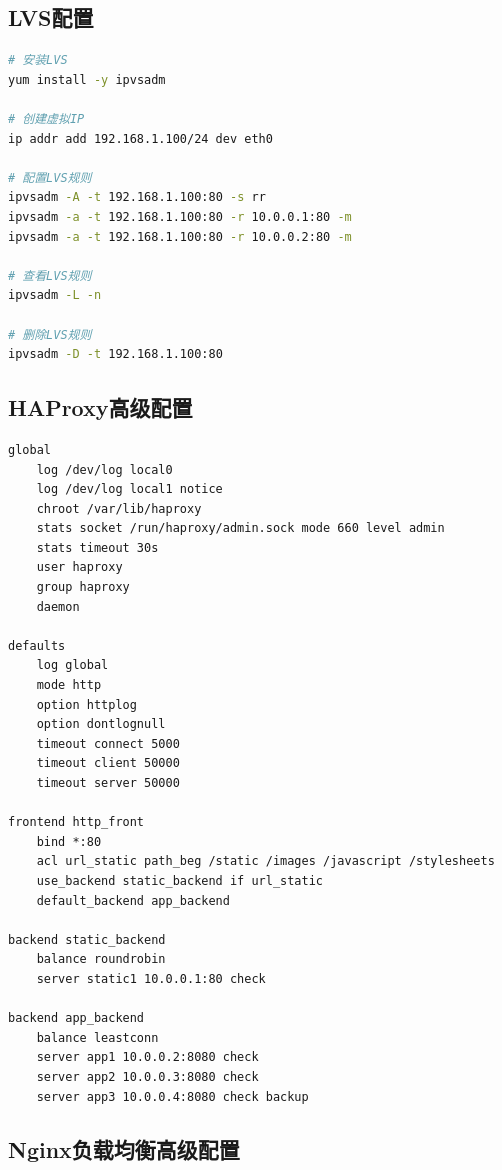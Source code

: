\documentclass[12pt,UTF8]{ctexbook}
\begin{document}
\subsection*{LVS配置}

\begin{lstlisting}[language=bash]
# 安装LVS
yum install -y ipvsadm

# 创建虚拟IP
ip addr add 192.168.1.100/24 dev eth0

# 配置LVS规则
ipvsadm -A -t 192.168.1.100:80 -s rr
ipvsadm -a -t 192.168.1.100:80 -r 10.0.0.1:80 -m
ipvsadm -a -t 192.168.1.100:80 -r 10.0.0.2:80 -m

# 查看LVS规则
ipvsadm -L -n

# 删除LVS规则
ipvsadm -D -t 192.168.1.100:80
\end{lstlisting}

\subsection*{HAProxy高级配置}

\begin{lstlisting}
global
    log /dev/log local0
    log /dev/log local1 notice
    chroot /var/lib/haproxy
    stats socket /run/haproxy/admin.sock mode 660 level admin
    stats timeout 30s
    user haproxy
    group haproxy
    daemon

defaults
    log global
    mode http
    option httplog
    option dontlognull
    timeout connect 5000
    timeout client 50000
    timeout server 50000

frontend http_front
    bind *:80
    acl url_static path_beg /static /images /javascript /stylesheets
    use_backend static_backend if url_static
    default_backend app_backend

backend static_backend
    balance roundrobin
    server static1 10.0.0.1:80 check

backend app_backend
    balance leastconn
    server app1 10.0.0.2:8080 check
    server app2 10.0.0.3:8080 check
    server app3 10.0.0.4:8080 check backup
\end{lstlisting}

\subsection*{Nginx负载均衡高级配置}
\end{document}

